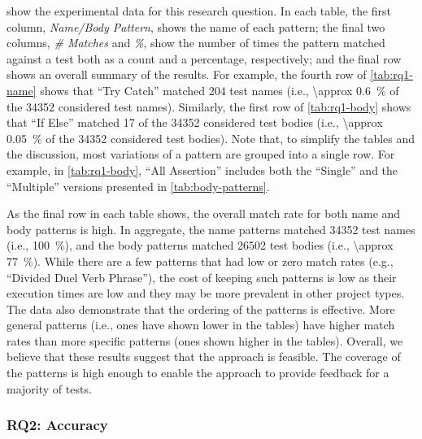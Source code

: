 \documentclass[proposal.tex]{subfiles}
\begin{document}
 show the experimental data for this research question.
% 
In each table, the first column, \emph{Name\slash Body Pattern}, shows the name of each pattern; the final two columns, \emph{\# Matches} and \emph{\%}, show the number of times the pattern matched against a test both as a count and a percentage, respectively; and the final row shows an overall summary of the results.
%
For example, the fourth row of \cref{tab:rq1-name} shows that \enquote{Try Catch} matched \num{204} test names (i.e., \SI{\approx 0.6}{\percent} of the \num{34352} considered test names).
%
Similarly, the first row of \cref{tab:rq1-body} shows that \enquote{If Else} matched \num{17} of the \num{34352} considered test bodies (i.e., \SI{\approx 0.05}{\percent} of the \num{34352} considered test bodies).
% 
Note that, to simplify the tables and the discussion, most variations of a pattern are grouped into a single row.  For example, in \cref{tab:rq1-body}, \enquote{All Assertion} includes both the \enquote{Single} and the \enquote{Multiple} versions presented in \cref{tab:body-patterns}.


As the final row in each table shows, the overall match rate for both name and body patterns is high.
%
In aggregate, the name patterns matched \num{34352} test names (i.e., \SI{100}{\percent}), and the body patterns matched \num{26502} test bodies (i.e., \SI{\approx 77}{\percent}).
%
While there are a few patterns that had low or zero match rates (e.g., \enquote{Divided Duel Verb Phrase}), the cost of keeping such patterns is low as their execution times are low and they may be more prevalent in other project types.
%
The data also demonstrate that the ordering of the patterns is effective.
%
More general patterns (i.e., ones have shown lower in the tables) have higher match rates than more specific patterns (ones shown higher in the tables).
%
Overall, we believe that these results suggest that the approach is feasible.
%
The coverage of the patterns is high enough to enable the approach to provide feedback for a majority of tests.


\subsubsection{RQ2: Accuracy}
\label{sec:evaluation:accuracy}
\end{document}
